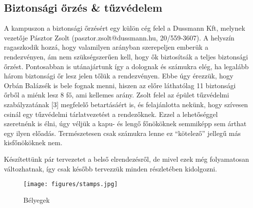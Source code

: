 \subsection{Biztonsági őrzés \& tűzvédelem}
\hspace{2mm} A kampuszon a biztonsági őrzésért egy külön cég felel a Dussmann Kft, melynek vezetője Pásztor Zsolt (pasztor.zsolt@dussmann.hu, 20/559-3607). A helyszín ragaszkodik hozzá, hogy valamilyen arányban szerepeljen emberük a rendezvényen, ám nem szükségszerűen kell, hogy ők biztosítsák a teljes biztonsági őrzést. Pontosabban is utánajártunk így a dolognak és számukra elég, ha legalább három biztonsági őr lesz jelen tőlük a rendezvényen. Ebbe úgy érezzük, hogy Orbán Balázsék is bele fognak menni, hiszen az előre láthatólag 11 biztonsági őrből a miénk lesz 8 fő, ami kellemes arány. Zsolt felel az épület tűzvédelmi szabályzatának [3] megfelelő betartásáért is, és felajánlotta nekünk, hogy szívesen csinál egy tűzvédelmi tárlatvezetést a rendezőknek. Ezzel a lehetőséggel szeretnénk is élni, úgy véljük a kapu- és lengő főnököknek semmiképp sem árthat egy ilyen előadás. Természetesen csak számukra lenne ez “kötelező” jellegű más kisfőnököknek nem. 

Készítettünk pár tervezetet a belső elrendezésről, de mivel ezek még folyamatosan változhatnak, így csak később tervezzük minden részletében kidolgozni.
\begin{figure}[t]
\centering
\texttt{[image: figures/stamps.jpg]}
\caption{Bélyegek}
\label{fig:Stamps}
\end{figure}
